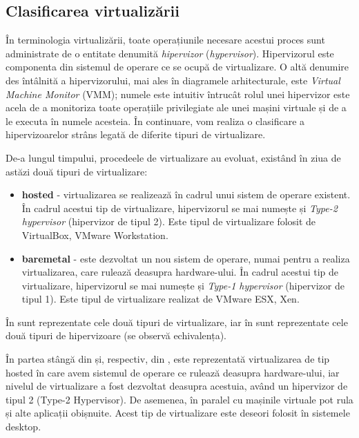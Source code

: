 \subsection{Clasificarea virtualizării}
\label{sec:vm:concepts:class}

În terminologia virtualizării, toate operațiunile necesare acestui proces sunt administrate de o entitate denumită \textit{hipervizor} (\textit{hypervisor}).
Hipervizorul este componenta din sistemul de operare ce se ocupă de virtualizare.
O altă denumire des întâlnită a hipervizorului, mai ales în diagramele arhitecturale, este \textit{Virtual Machine Monitor} (VMM);
numele este intuitiv întrucât rolul unei hipervizor este acela de a monitoriza toate operațiile privilegiate ale unei mașini virtuale și de a le executa în numele acesteia.
În continuare, vom realiza o clasificare a hipervizoarelor strâns legată de diferite tipuri de virtualizare.

De-a lungul timpului, procedeele de virtualizare au evoluat, existând în ziua de astăzi două tipuri de virtualizare:

\begin{itemize}
  \item \textbf{hosted} - virtualizarea se realizează în cadrul unui sistem de operare existent.
    În cadrul acestui tip de virtualizare, hipervizorul se mai numește și \textit{Type-2 hypervisor} (hipervizor de tipul 2).
    Este tipul de virtualizare folosit de VirtualBox, VMware Workstation.
  \item \textbf{baremetal} - este dezvoltat un nou sistem de operare, numai pentru a realiza virtualizarea, care rulează deasupra hardware-ului.
    În cadrul acestui tip de virtualizare, hipervizorul se mai numește și \textit{Type-1 hypervisor} (hipervizor de tipul 1).
    Este tipul de virtualizare realizat de VMware ESX, Xen.
\end{itemize}

În  sunt reprezentate cele două tipuri de virtualizare, iar în  sunt reprezentate cele două tipuri de hipervizoare (se observă echivalența).

În partea stângă din  și, respectiv, din , este reprezentată virtualizarea de tip hosted în care avem sistemul de operare ce rulează deasupra hardware-ului, iar nivelul de virtualizare a fost dezvoltat deasupra acestuia, având un hipervizor de tipul 2 (Type-2 Hypervisor).
De asemenea, în paralel cu mașinile virtuale pot rula și alte aplicații obișnuite.
Acest tip de virtualizare este deseori folosit în sistemele desktop.

